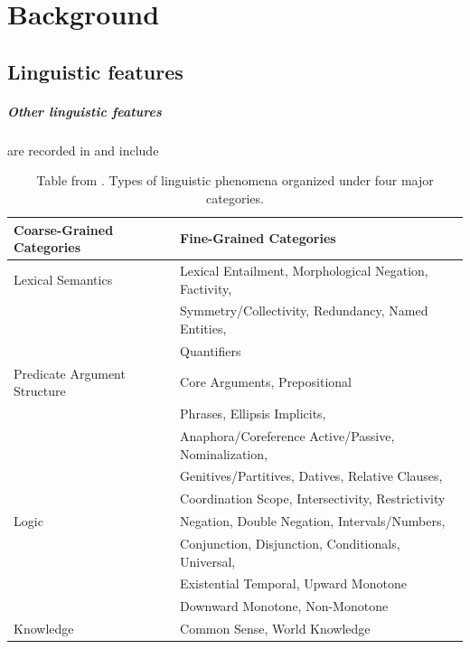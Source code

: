 \documentclass[a4paper,12pt,oneside,openright]{report}
\begin{document}
\appendix
\singlespacing

%  

% 
% 
 

\chapter{Background}

\section{Linguistic features}\label{appendix:linguistic_features}

\paragraph{Other linguistic features} are recorded in \cite{wang19} and include

\begin{table}[h!]
\centering
\begin{tabular}{l l} 
 \hline
 Coarse-Grained Categories & Fine-Grained Categories \\ [0.5ex] 
 \hline
 Lexical Semantics & Lexical Entailment, Morphological Negation, Factivity, \\
&  Symmetry/Collectivity, Redundancy, Named Entities, \\
& Quantifiers \\ 
Predicate Argument Structure & Core Arguments, Prepositional \\ & Phrases, Ellipsis \/ Implicits, \\
& Anaphora/Coreference Active/Passive, Nominalization, \\
& Genitives/Partitives, Datives, Relative Clauses, \\
& Coordination Scope, Intersectivity, Restrictivity \\
Logic & Negation, Double Negation, Intervals/Numbers, \\
& Conjunction, Disjunction, Conditionals, Universal, \\
& Existential Temporal, Upward Monotone \\
& Downward Monotone, Non-Monotone \\
Knowledge & Common Sense, World Knowledge \\ [1ex] 
\hline
\end{tabular}
\caption{Table from \cite{wang19}. Types of linguistic phenomena organized under four major categories.}
\label{table:1}
\end{table}
\end{document}
